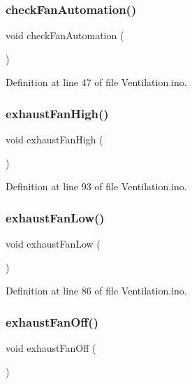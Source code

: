 \subsubsection{\texorpdfstring{checkFanAutomation()}{checkFanAutomation()}}
{\footnotesize\ttfamily void check\+Fan\+Automation (\begin{DoxyParamCaption}{ }\end{DoxyParamCaption})}



Definition at line 47 of file Ventilation.\+ino.

\mbox{\label{_ventilation_8ino_a55291f95f235e9d2e2e26759ca8d2124}} 
\subsubsection{\texorpdfstring{exhaustFanHigh()}{exhaustFanHigh()}}
{\footnotesize\ttfamily void exhaust\+Fan\+High (\begin{DoxyParamCaption}{ }\end{DoxyParamCaption})}



Definition at line 93 of file Ventilation.\+ino.

\mbox{\label{_ventilation_8ino_a020e447d9d64f412e11f197943fed8f6}} 
\subsubsection{\texorpdfstring{exhaustFanLow()}{exhaustFanLow()}}
{\footnotesize\ttfamily void exhaust\+Fan\+Low (\begin{DoxyParamCaption}{ }\end{DoxyParamCaption})}



Definition at line 86 of file Ventilation.\+ino.

\mbox{\label{_ventilation_8ino_a8b57ffa8f3964f1fe353558f7e44c570}} 
\subsubsection{\texorpdfstring{exhaustFanOff()}{exhaustFanOff()}}
{\footnotesize\ttfamily void exhaust\+Fan\+Off (\begin{DoxyParamCaption}{ }\end{DoxyParamCaption})}



